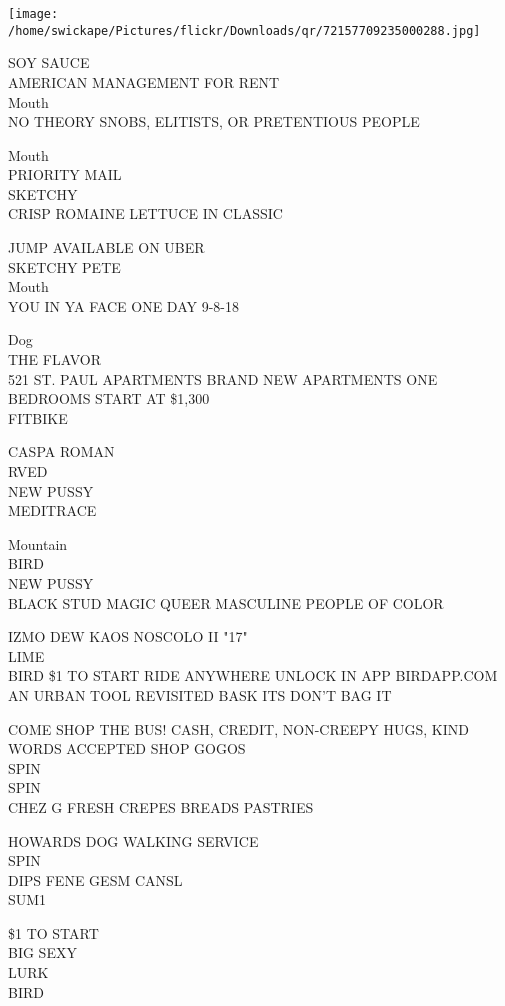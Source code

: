 \documentclass[10pt,letterpaper]{article}
\begin{document}
\texttt{[image: /home/swickape/Pictures/flickr/Downloads/qr/72157709235000288.jpg]}


SOY SAUCE\\
AMERICAN MANAGEMENT FOR RENT\\
Mouth\\
NO THEORY SNOBS, ELITISTS, OR PRETENTIOUS PEOPLE

Mouth\\
PRIORITY MAIL\\
SKETCHY\\
CRISP ROMAINE LETTUCE IN CLASSIC

JUMP AVAILABLE ON UBER\\
SKETCHY PETE\\
Mouth\\
YOU IN YA FACE ONE DAY 9{-}8{-}18

Dog\\
THE FLAVOR\\
521 ST. PAUL APARTMENTS BRAND NEW APARTMENTS ONE BEDROOMS START AT \$1,300\\
FITBIKE

CASPA ROMAN\\
RVED\\
NEW PUSSY\\
MEDITRACE

Mountain\\
BIRD\\
NEW PUSSY\\
BLACK STUD MAGIC QUEER MASCULINE PEOPLE OF COLOR

IZMO DEW KAOS NOSCOLO II "17"\\
LIME\\
BIRD \$1 TO START RIDE ANYWHERE UNLOCK IN APP BIRDAPP.COM\\
AN URBAN TOOL REVISITED BASK ITS DON'T BAG IT

COME SHOP THE BUS!  CASH, CREDIT, NON{-}CREEPY HUGS, KIND WORDS ACCEPTED SHOP GOGOS\\
SPIN\\
SPIN\\
CHEZ G FRESH CREPES BREADS PASTRIES

HOWARDS DOG WALKING SERVICE\\
SPIN\\
DIPS FENE GESM CANSL\\
SUM1

\$1 TO START\\
BIG SEXY\\
LURK\\
BIRD
\end{document}
